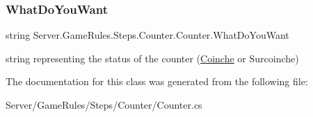 \subsubsection{\texorpdfstring{What\+Do\+You\+Want}{WhatDoYouWant}}
{\footnotesize\ttfamily string Server.\+Game\+Rules.\+Steps.\+Counter.\+Counter.\+What\+Do\+You\+Want\hspace{0.3cm}{\ttfamily [private]}}



string representing the status of the counter (\hyperlink{namespace_coinche}{Coinche} or Surcoinche) 



The documentation for this class was generated from the following file\+:\begin{DoxyCompactItemize}
\item 
Server/\+Game\+Rules/\+Steps/\+Counter/Counter.\+cs\end{DoxyCompactItemize}
